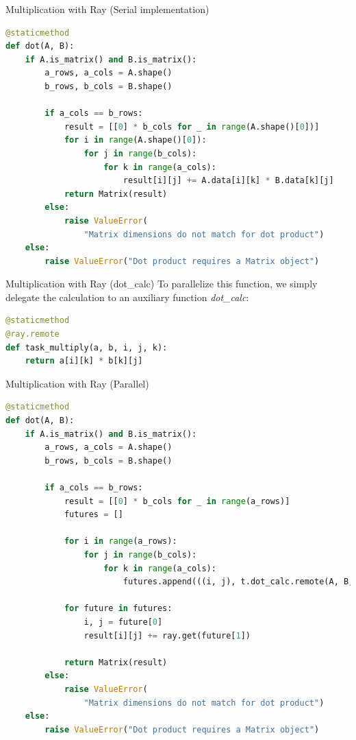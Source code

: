 \documentclass{beamer}
\begin{document}
\begin{frame}[fragile]{Multiplication with Ray (Serial implementation)}
    \begin{lstlisting}[language=Python]
@staticmethod
def dot(A, B):
    if A.is_matrix() and B.is_matrix():
        a_rows, a_cols = A.shape()
        b_rows, b_cols = B.shape()

        if a_cols == b_rows:
            result = [[0] * b_cols for _ in range(A.shape()[0])]
            for i in range(A.shape()[0]):
                for j in range(b_cols):
                    for k in range(a_cols):
                        result[i][j] += A.data[i][k] * B.data[k][j]
            return Matrix(result)
        else:
            raise ValueError(
                "Matrix dimensions do not match for dot product")
    else:
        raise ValueError("Dot product requires a Matrix object")
    \end{lstlisting}
\end{frame}

\begin{frame}[fragile]{Multiplication with Ray (dot\_calc)}
    To parallelize this function, we simply delegate the calculation to an auxiliary function \textit{dot\_calc}:

    \begin{lstlisting}[language=Python]
@staticmethod
@ray.remote
def task_multiply(a, b, i, j, k):
    return a[i][k] * b[k][j]
    \end{lstlisting}

\end{frame}

\begin{frame}[fragile]{Multiplication with Ray (Parallel)}
    \begin{lstlisting}[language=Python]
@staticmethod
def dot(A, B):
    if A.is_matrix() and B.is_matrix():
        a_rows, a_cols = A.shape()
        b_rows, b_cols = B.shape()

        if a_cols == b_rows:
            result = [[0] * b_cols for _ in range(a_rows)]
            futures = []

            for i in range(a_rows):
                for j in range(b_cols):
                    for k in range(a_cols):
                        futures.append(((i, j), t.dot_calc.remote(A, B, i, j, k)))
            
            for future in futures:
                i, j = future[0]
                result[i][j] += ray.get(future[1])

            return Matrix(result)
        else:
            raise ValueError(
                "Matrix dimensions do not match for dot product")
    else:
        raise ValueError("Dot product requires a Matrix object")
\end{lstlisting}
\end{frame}
\end{document}
